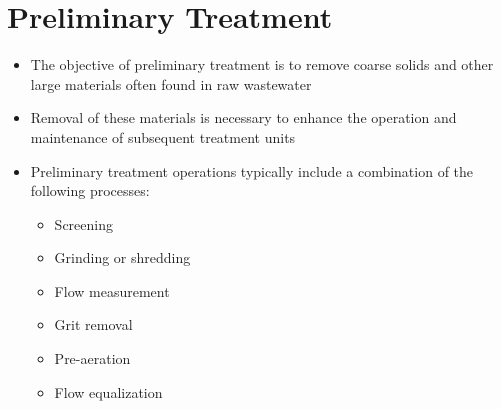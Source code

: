 

\chapter{Preliminary Treatment}









			\begin{itemize}
				\item The objective of preliminary treatment is to remove coarse solids and other large materials often found in raw wastewater
				\item Removal of these materials is necessary to enhance the operation and maintenance of subsequent treatment units\\
				\item Preliminary treatment operations typically include a combination of the following processes:
					\begin{itemize}
						\item Screening
						\item Grinding or shredding
						\item Flow measurement
						\item Grit removal
						\item Pre-aeration
						\item Flow equalization
					\end{itemize}
			\end{itemize}

